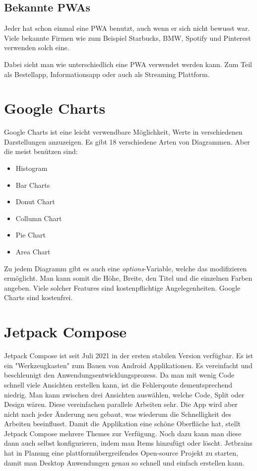\subsection{Bekannte PWAs}

Jeder hat schon einmal eine PWA benutzt, auch wenn er sich nicht bewusst war. Viele bekannte Firmen wie zum Beispiel Starbucks,
BMW, Spotify und Pinterest verwenden solch eine.

Dabei sieht man wie unterschiedlich eine PWA verwendet werden kann. Zum Teil als Bestellapp, Informationsapp oder auch als Streaming Plattform.





\section{Google Charts}
\cite{Google-Charts}
Google Charts ist eine leicht verwendbare Möglichkeit, Werte in verschiedenen Darstellungen anzuzeigen.
Es gibt 18 verschiedene Arten von Diagrammen. Aber die meist benützen sind:

\begin{itemize}
    \item Histogram
    \item Bar Charts
    \item Donut Chart
    \item Collumn Chart
    \item Pie Chart
    \item Area Chart
\end{itemize}
Zu jedem Diagramm gibt es auch eine \textit{options}-Variable, welche das modifizieren ermöglicht.
Man kann somit die Höhe, Breite, den Titel und die einzelnen Farben angeben.
\linebreak
Viele solcher Features sind kostenpflichtige Angelegenheiten. Google Charts sind kostenfrei.

\section{Jetpack Compose}
\cite{Jetpack-Compose}
\author{Bozidar Spasenovic}
Jetpack Compose ist seit Juli 2021 in der ersten stabilen Version verfügbar. Es ist ein "Werkzeugkasten" zum Bauen von Android Applikationen.
Es vereinfacht und beschleunigt den Anwendungsentwicklungsprozess. Da man mit wenig Code schnell viele Ansichten erstellen kann, ist die Fehlerqoute dementsprechend niedrig.
Man kann zwischen drei Ansichten auswählen, welche Code, Split oder Design wären. Diese vereinfachen parallele Arbeiten sehr. 
Die App wird aber nicht nach jeder Änderung neu gebaut, was wiederum die Schnelligkeit des Arbeiten beeinflusst. Damit die Applikation eine schöne Oberfläche hat, stellt
Jetpack Compose mehrere Themes zur Verfügung. Noch dazu kann man diese dann auch selbst konfigurieren, indem man Items hinzufügt oder löscht.
Jetbrains hat in Planung eine plattformübergreifendes Open-source Projekt zu starten, damit man Desktop Anwendungen genau so schnell und einfach erstellen kann. 

